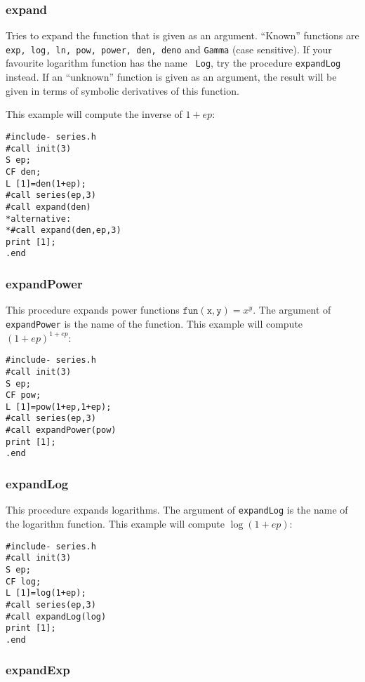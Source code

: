 \documentclass[titlepage]{article}
\begin{document}
\subsubsection{expand}
\label{sec:expand}

Tries to expand the function that is given as an argument. ``Known''
functions are {\tt exp, log, ln, pow, power, den, deno} and {\tt Gamma}
(case sensitive). If your favourite logarithm function has the name {\tt
Log}, try the procedure {\tt expandLog} instead. If an ``unknown''
function is given as an argument, the result will be given in terms of
symbolic derivatives of this function.

This example will compute the
inverse of $1+ep$:
\begin{verbatim}
#include- series.h
#call init(3)
S ep;
CF den;
L [1]=den(1+ep);
#call series(ep,3)
#call expand(den)
*alternative:
*#call expand(den,ep,3)
print [1];
.end
\end{verbatim}

\subsubsection{expandPower}
\label{sec:pow_fun}

This procedure expands power functions $\mathtt{fun(x,y)} = x^y$. The
argument of {\tt expandPower} is the name of the function. This example
will compute $(1+ep)^{1+ep}$:
\begin{verbatim}
#include- series.h
#call init(3)
S ep;
CF pow;
L [1]=pow(1+ep,1+ep);
#call series(ep,3)
#call expandPower(pow)
print [1];
.end
\end{verbatim}

\subsubsection{expandLog}
\label{sec:log_fun}

This procedure expands logarithms. The argument of {\tt expandLog} is the name of the
logarithm function. This example will compute $\log(1+ep)$:
\begin{verbatim}
#include- series.h
#call init(3)
S ep;
CF log;
L [1]=log(1+ep);
#call series(ep,3)
#call expandLog(log)
print [1];
.end
\end{verbatim}

\subsubsection{expandExp}
\label{sec:exp_fun}
\end{document}
